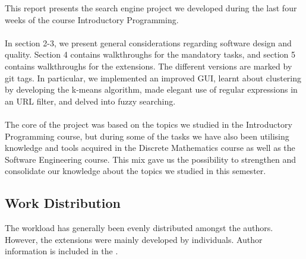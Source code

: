 This report presents the search engine project we developed during the last four weeks of the course Introductory Programming.
\\
\\
In section 2-3, we present general considerations regarding software design and quality. Section 4 contains walkthroughs for the mandatory tasks, and section 5 contains walkthroughs for the extensions. The different versions are marked by git tags.
In particular, we implemented an improved GUI, learnt about clustering by developing the k-means algorithm, made elegant use of regular expressions in an URL filter, and delved into fuzzy searching.
\\
\\
The core of the project was based on the topics we studied in the Introductory Programming course, but during some of the tasks we have also been utilising  knowledge and tools acquired in the Discrete Mathematics course as well as the Software Engineering course.
This mix gave us the possibility to strengthen and consolidate our knowledge about the topics we studied in this semester.
\subsection{Work Distribution}
The workload has generally been evenly distributed amongst the authors. However, the extensions were mainly developed by individuals. Author information is included in the .